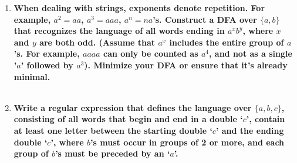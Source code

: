 \begin{enumerate}
\begin{enumerate}
    \item

    \item

\end{enumerate}

\newpage
\item \textbf{When dealing with strings, exponents denote repetition. For
  example, $a^2=aa$, $a^3=aaa$, $a^n= n a$'s.  Construct a DFA over
  $\{a,b\}$ that recognizes the language of all words ending in $a^xb^y$,
  where $x$ and $y$ are both odd. (Assume that $a^x$ includes the entire group
  of $a$'s.  For example, $aaaa$ can only be counted as $a^4$, and not as a
  single '$a$' followed by $a^3$). Minimize your DFA or ensure that it's
  already minimal.}
\\\\


\newpage
\item \textbf{Write a regular expression that defines the language over
  $\{a,b,c\}$, consisting of all words that begin and end in a double ‘$c$’, contain at least one letter between the starting double ‘$c$’ and the ending double ‘$c$’, where $b$’s must occur in groups of 2  or more, and each group of $b$’s must be preceded by an ‘$a$’.}
\\\\


\end{enumerate}
